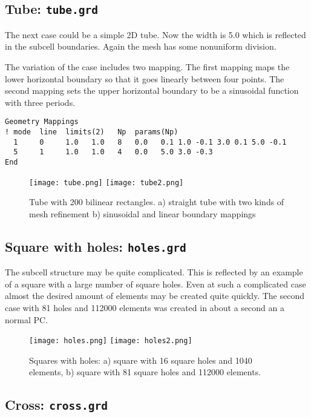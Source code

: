 \subsection*{Tube: \texttt{tube.grd}}

The next case could be a simple 2D tube. 
Now the width is 5.0 which is reflected in 
the subcell boundaries. Again the mesh has some nonuniform division.

%
The variation of the case includes two mapping. The first mapping
maps the lower horizontal boundary so that it goes linearly between four points.
The second mapping sets the upper horizontal boundary to be a sinusoidal
function with three periods. 
\begin{verbatim}
Geometry Mappings 
! mode  line  limits(2)   Np  params(Np)
  1     0     1.0   1.0   8   0.0	0.1 1.0 -0.1 3.0 0.1 5.0 -0.1 
  5     1     1.0   1.0   4   0.0	5.0 3.0 -0.3
End 
\end{verbatim}
%
\begin{figure}
\begin{center}
\texttt{[image: tube.png]} 
\texttt{[image: tube2.png]}
\end{center}
\caption{Tube with 200 bilinear rectangles.
a) straight tube with 
two kinds of mesh refinement
b) sinusoidal and linear boundary mappings}
\label{pic3}
\end{figure}

\subsection*{Square with holes: \texttt{holes.grd}}

The subcell structure may be quite complicated. This is reflected by an
example of a square with a large number of square holes. Even at such a complicated
case almost the desired amount of elements may be created quite quickly.
The second case with 81 holes and 112000 elements was created in 
about a second an a normal PC.

%
\begin{figure}
\begin{center}
\texttt{[image: holes.png]}
\texttt{[image: holes2.png]}
\end{center}
\caption{Squares with holes: 
a) square with 16 square holes and 1040 elements,
b) square with 81 square holes and 112000 elements.}
\label{pic5}
\end{figure}


\subsection*{Cross: \texttt{cross.grd}}

